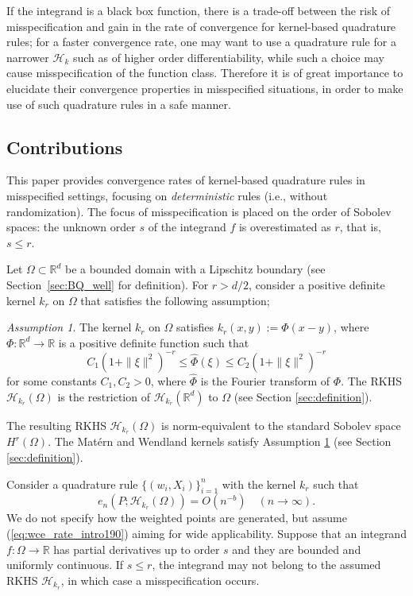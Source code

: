\documentclass[11pt]{article}
\theoremstyle{remark}
\theoremstyle{example}
\theoremstyle{remark}
\renewcommand{\H}{{\mathcal{H}}}
\newcommand{\R}{\mathbb{R}}
\newtheorem{assumption}{Assumption}
\begin{document}
If the integrand is a black box function, there is a trade-off between the risk of misspecification and gain in the rate of convergence for kernel-based quadrature rules; for a faster convergence rate, one may want to use a quadrature rule for a narrower $\H_k$ such as of higher order differentiability, while such a choice may cause misspecification of the function class.  Therefore it is of great importance to elucidate their convergence properties in misspecified situations, in order to make use of such quadrature rules in a safe manner.


\subsection{Contributions}
This paper provides convergence rates of kernel-based quadrature rules in misspecified settings, focusing on {\em deterministic} rules (i.e., without randomization).
The focus of misspecification is placed on the order of Sobolev spaces: the unknown order $s$ of the integrand $f$ is overestimated as $r$, that is, $s \leq r$.

Let $\Omega \subset \R^d$ be a bounded domain with a Lipschitz boundary (see Section~\ref{sec:BQ_well} for definition).  For $r>d/2$, consider a positive definite kernel $k_r$ on $\Omega$ that satisfies the following assumption;
\begin{assumption} \label{assumption:kernel}
The kernel $k_r$ on $\Omega$ satisfies $k_r(x,y) := \Phi(x-y)$, where $\Phi: \R^d \to \R$ is a positive definite function such that  
\[
C_1 (1 + \| \xi \|^2)^{-r} \leq \hat{\Phi} (\xi) \leq C_2 (1 + \| \xi \|^2)^{-r}
\]
for some constants $C_1, C_2 > 0$, where $\hat{\Phi}$ is the Fourier transform of $\Phi$. The RKHS $\H_{k_r}(\Omega)$ is the restriction of $\H_{k_r}(\R^d)$ to $\Omega$ (see Section \ref{sec:definition}).
\end{assumption}
The resulting RKHS $\H_{k_r}(\Omega)$ is norm-equivalent to the standard Sobolev space $H^r(\Omega)$. The Mat\'ern and Wendland kernels satisfy Assumption \ref{assumption:kernel} (see Section \ref{sec:definition}).
 
Consider a quadrature rule $\{ (w_i,X_i) \}_{i=1}^n$ with the kernel $k_r$ such that 
\begin{equation} \label{eq:wce_rate_intro190}
e_n(P;\H_{k_r}(\Omega)) = O(n^{-b}) \quad (n \to \infty).
\end{equation}
We do not specify how the weighted points are generated, but assume  (\ref{eq:wce_rate_intro190}) aiming for wide applicability.  Suppose that an integrand $f:\Omega \to \R$ has partial derivatives up to order $s$ and they are bounded and uniformly continuous. 
If $s \leq r$, the integrand may not belong to the assumed RKHS $\H_{k_r}$, in which case a misspecification occurs.
\end{document}
